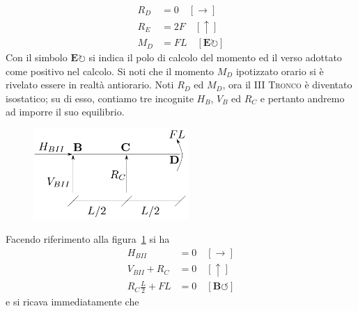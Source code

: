 \begin{align*}
R_D &= 0 \quad [\to] \\ 
R_E &= 2F \quad [\uparrow] \\
M_D &= FL \quad [\mathbf{E}\circlearrowright]
\end{align*}
Con il simbolo $\mathbf{E}\circlearrowright$ si indica il polo di calcolo del momento ed il verso adottato come positivo nel calcolo. Si noti che il momento $M_D$ ipotizzato orario si è rivelato essere in realtà antiorario. Noti $R_D$ ed $M_D$, ora il \textsc{III Tronco} è diventato isostatico; su di esso, contiamo tre incognite $H_B$, $V_B$ ed $R_C$ e pertanto andremo ad imporre il suo equilibrio.
\renewcommand{\thefigure}{8.1~-~3}
\begin{figure}[ht]
\centering
\includegraphics[width=0.525\textwidth]{Immagini/Parte_8/Esercizio8_1/Esercizio8_1_5.pdf}
\caption{}
\label{Esercizio8-1-3}
\end{figure}
Facendo riferimento alla figura~\ref{Esercizio8-1-3} si ha
\begin{align*}
H_{BII} &= 0 \quad [\to] \\ 
V_{BII} + R_C &= 0 \quad [\uparrow] \\
R_{C}\frac{L}{2} + FL &=0 \quad [\mathbf{B}\circlearrowleft]
\end{align*}
e si ricava immediatamente che
